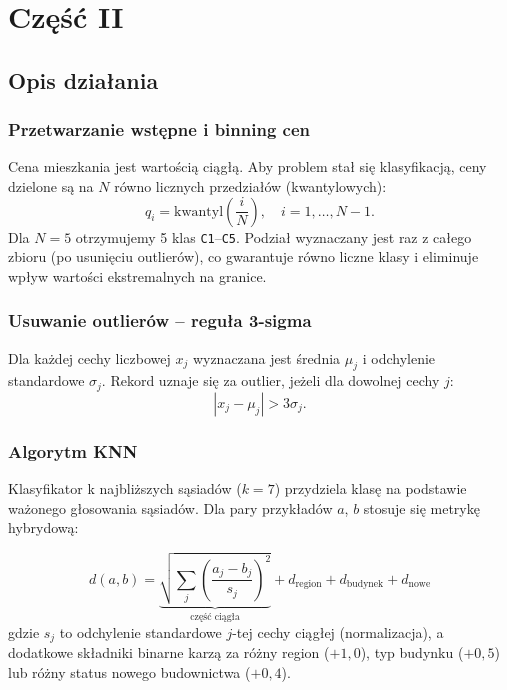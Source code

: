\documentclass[12pt,a4paper]{article}
\begin{document}
	\newpage

	\section{Część II}

	\subsection{Opis działania}
	
	\subsubsection{Przetwarzanie wstępne i binning cen}
	
	Cena mieszkania jest wartością ciągłą. Aby problem stał się klasyfikacją,
	ceny dzielone są na $N$ równo licznych przedziałów (kwantylowych):
	\[
	q_i = \text{kwantyl}\!\left(\frac{i}{N}\right), \quad i = 1,\ldots, N-1.
	\]
	Dla $N = 5$ otrzymujemy 5 klas \texttt{C1}--\texttt{C5}.
	Podział wyznaczany jest raz z całego zbioru (po usunięciu outlierów),
	co gwarantuje równo liczne klasy i eliminuje wpływ wartości ekstremalnych na granice.
	
	\subsubsection*{Usuwanie outlierów -- reguła 3-sigma}
	
	Dla każdej cechy liczbowej $x_j$ wyznaczana jest średnia $\mu_j$ i odchylenie standardowe $\sigma_j$.
	Rekord uznaje się za outlier, jeżeli dla dowolnej cechy $j$:
	\[
	|x_j - \mu_j| > 3\sigma_j.
	\]
	
	\subsubsection{Algorytm KNN}
	
	Klasyfikator k najbliższych sąsiadów ($k = 7$) przydziela klasę na podstawie
	ważonego głosowania sąsiadów. Dla pary przykładów $a$, $b$ stosuje się metrykę hybrydową:
	
	\[
	d(a, b) = \underbrace{\sqrt{\sum_{j} \left(\frac{a_j - b_j}{s_j}\right)^2}}_{\text{część ciągła}}
	+ d_{\text{region}} + d_{\text{budynek}} + d_{\text{nowe}}
	\]
	gdzie $s_j$ to odchylenie standardowe $j$-tej cechy ciągłej (normalizacja),
	a dodatkowe składniki binarne karzą za różny region ($+1{,}0$), typ budynku ($+0{,}5$)
	lub różny status nowego budownictwa ($+0{,}4$).
	
\end{document}
